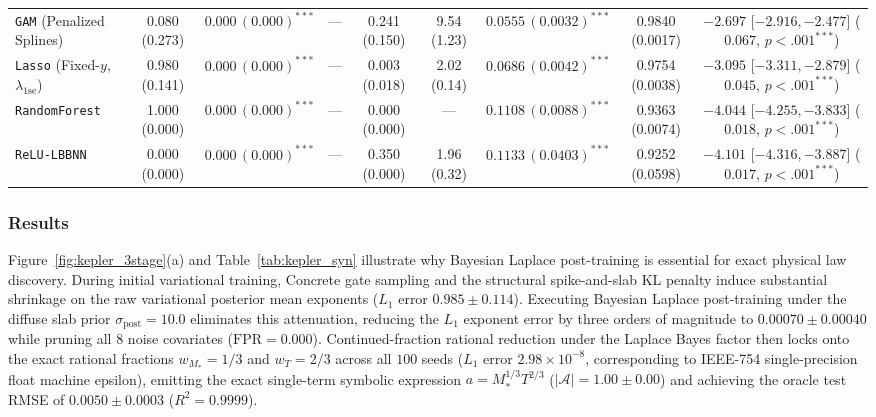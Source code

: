 \documentclass[11pt,a4paper]{article}
\begin{document}
\begin{table}[t!]
{\begin{tabular}{lcccccccc}
\texttt{GAM} (Penalized Splines) & 0.080 (0.273) & $0.000\,(0.000)^{***}$ & --- & 0.241 (0.150) & 9.54 (1.23) & $0.0555\,(0.0032)^{***}$ & 0.9840 (0.0017) & $-2.697$ [$-2.916, -2.477$] ($0.067$, $p < .001^{***}$) \\
\texttt{Lasso} (Fixed-$y$, $\lambda_{\text{1se}}$) & 0.980 (0.141) & $0.000\,(0.000)^{***}$ & --- & 0.003 (0.018) & 2.02 (0.14) & $0.0686\,(0.0042)^{***}$ & 0.9754 (0.0038) & $-3.095$ [$-3.311, -2.879$] ($0.045$, $p < .001^{***}$) \\
\texttt{RandomForest} & 1.000 (0.000) & $0.000\,(0.000)^{***}$ & --- & 0.000 (0.000) & --- & $0.1108\,(0.0088)^{***}$ & 0.9363 (0.0074) & $-4.044$ [$-4.255, -3.833$] ($0.018$, $p < .001^{***}$) \\
\texttt{ReLU-LBBNN} & 0.000 (0.000) & $0.000\,(0.000)^{***}$ & --- & 0.350 (0.000) & 1.96 (0.32) & $0.1133\,(0.0403)^{***}$ & 0.9252 (0.0598) & $-4.101$ [$-4.316, -3.887$] ($0.017$, $p < .001^{***}$) \\
\bottomrule
\end{tabular}%
}
\end{table}

\subsubsection{Results}
Figure~\ref{fig:kepler_3stage}(a) and Table~\ref{tab:kepler_syn} illustrate why Bayesian Laplace post-training is essential for exact physical law discovery. During initial variational training, Concrete gate sampling and the structural spike-and-slab KL penalty induce substantial shrinkage on the raw variational posterior mean exponents ($L_1$ error $0.985 \pm 0.114$). Executing Bayesian Laplace post-training under the diffuse slab prior $\sigma_{\text{post}} = 10.0$ eliminates this attenuation, reducing the $L_1$ exponent error by three orders of magnitude to $0.00070 \pm 0.00040$ while pruning all $8$ noise covariates ($\text{FPR} = 0.000$). Continued-fraction rational reduction under the Laplace Bayes factor then locks onto the exact rational fractions $w_{M_*} = 1/3$ and $w_T = 2/3$ across all $100$ seeds ($L_1$ error $2.98 \times 10^{-8}$, corresponding to IEEE-754 single-precision float machine epsilon), emitting the exact single-term symbolic expression $a = M_*^{1/3} T^{2/3}$ ($|\mathcal{A}| = 1.00 \pm 0.00$) and achieving the oracle test RMSE of $0.0050 \pm 0.0003$ ($R^2 = 0.9999$).
\end{document}
